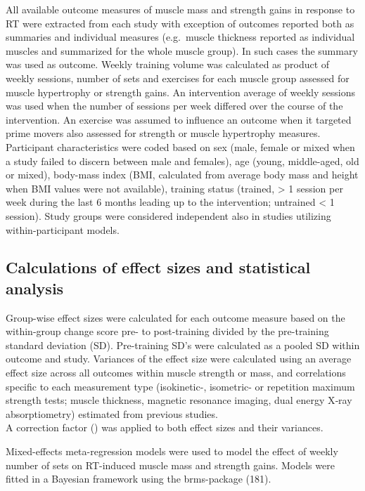 \documentclass[twoside,10pt]{gihclass} %
\begin{document}
All available outcome measures of muscle mass and strength gains in
response to RT were extracted from each study with exception of outcomes
reported both as summaries and individual measures (e.g.~muscle
thickness reported as individual muscles and summarized for the whole
muscle group). In such cases the summary was used as outcome. Weekly
training volume was calculated as product of weekly sessions, number of
sets and exercises for each muscle group assessed for muscle hypertrophy
or strength gains. An intervention average of weekly sessions was used
when the number of sessions per week differed over the course of the
intervention. An exercise was assumed to influence an outcome when it
targeted prime movers also assessed for strength or muscle hypertrophy
measures. Participant characteristics were coded based on sex (male,
female or mixed when a study failed to discern between male and
females), age (young, middle-aged, old or mixed), body-mass index (BMI,
calculated from average body mass and height when BMI values were not
available), training status (trained, \textgreater{} 1 session per week during the
last 6 months leading up to the intervention; untrained \textless{} 1 session).
Study groups were considered independent also in studies utilizing
within-participant models.

\hypertarget{calculations-of-effect-sizes-and-statistical-analysis}{%
\subsection{Calculations of effect sizes and statistical analysis}\label{calculations-of-effect-sizes-and-statistical-analysis}}

Group-wise effect sizes were calculated for each outcome measure based
on the within-group change score pre- to post-training divided by the
pre-training standard deviation (SD). Pre-training SD's were calculated
as a pooled SD within outcome and study. Variances of the effect size
were calculated using an average effect size across all outcomes within
muscle strength or mass, and correlations specific to each measurement
type (isokinetic-, isometric- or repetition maximum strength tests;
muscle thickness, magnetic resonance imaging, dual energy X‐ray
absorptiometry) estimated from previous studies.\\
A correction factor () was applied to both effect sizes and their
variances.

Mixed-effects meta-regression models were used to model the effect of
weekly number of sets on RT-induced muscle mass and strength gains.
Models were fitted in a Bayesian framework using the brms-package
(181).
\end{document}
